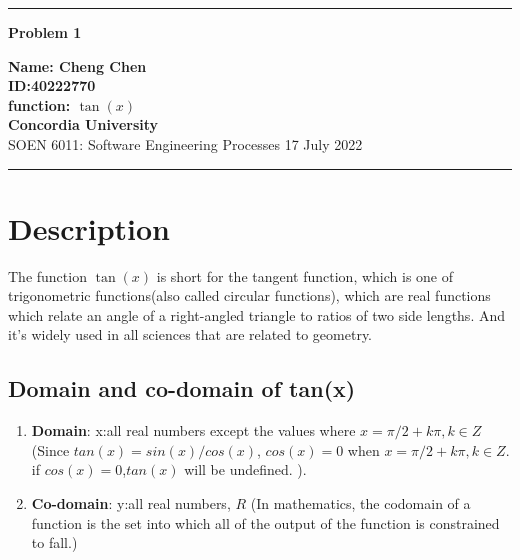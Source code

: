 \documentclass[10pt,a4paper,twoside]{article}
\begin{document}
\begin{center}
\hrule
\vspace{.4cm}
{\bf {\Huge Problem 1}}
\vspace{.2cm}
\end{center}
{\bf Name: Cheng Chen}  \\
{\bf ID:40222770}\\
{\bf function: $\tan(x)$}\\
{\bf Concordia University}\\
SOEN 6011: Software Engineering Processes {\bf  } \hspace{\fill}  17 July  2022 \\
\hrule







\section{Description}
The function $\tan(x)$ is short for the tangent function, which is one of trigonometric functions(also called circular functions), which are real functions which relate an angle of a right-angled triangle to ratios of two side lengths. And it's widely used in all sciences that are related to geometry.
\cite{114514}
\subsection{Domain and co-domain of tan(x)}
\begin{enumerate}
\item 
\textbf{Domain}: x:all real numbers except the values where $x = \pi /2+k\pi, k\in Z$ (Since $tan(x)=sin(x)/cos(x)$, $cos(x)=0$ when $x = \pi /2+k\pi, k\in Z$. if $cos(x)=0$,$tan(x)$ will be undefined. ).
\item 
\textbf{Co-domain}: y:all real numbers, $R$ (In mathematics, the codomain of a function is the set into which all of the output of the function is constrained to fall.\cite{134524})
\end{enumerate}
\end{document}
